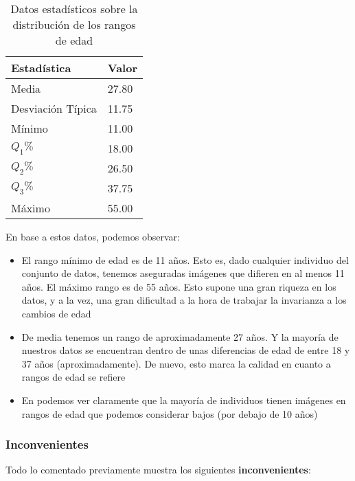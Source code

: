 \begin{table}[H]
\centering
\begin{tabular}{|l|l|}
    \hline
    \textbf{Estadística} & \textbf{Valor} \\
    \hline

    Media             & 27.80 \\
    Desviación Típica & 11.75 \\
    Mínimo            & 11.00 \\
    $Q_1 \%$          & 18.00 \\
    $Q_2 \%$          & 26.50 \\
    $Q_3 \%$          & 37.75 \\
    Máximo            & 55.00 \\

    \hline

\end{tabular}
\caption{Datos estadísticos sobre la distribución de los rangos de edad}
\label{table:fgnet_rangos_estadisticas}
\end{table}

En base a estos datos, podemos observar:

\begin{itemize}
    \item El rango mínimo de edad es de 11 años. Esto es, dado cualquier individuo del conjunto de datos, tenemos aseguradas imágenes que difieren en al menos 11 años. El máximo rango es de 55 años. Esto supone una gran riqueza en los datos, y a la vez, una gran dificultad a la hora de trabajar la invarianza a los cambios de edad
    \item De media tenemos un rango de aproximadamente 27 años. Y la mayoría de nuestros datos se encuentran dentro de unas diferencias de edad de entre 18 y 37 años (aproximadamente). De nuevo, esto marca la calidad en cuanto a rangos de edad se refiere
    \item En  podemos ver claramente que la mayoría de individuos tienen imágenes en rangos de edad que podemos considerar bajos (por debajo de 10 años)
\end{itemize}

\subsubsection{Inconvenientes} \label{isubsubs:fgnet_inconvenientes}

Todo lo comentado previamente muestra los siguientes \textbf{inconvenientes}:

